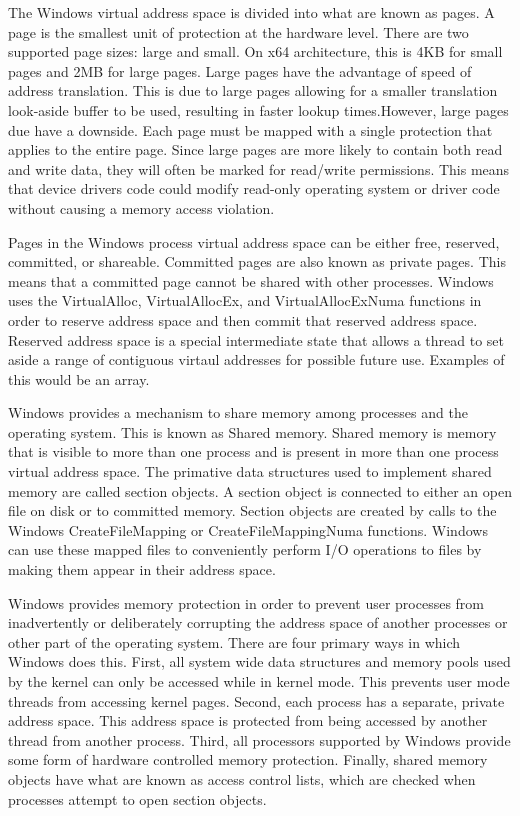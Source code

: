 \documentclass[journal,letterpaper,draftclsnofoot,onecolumn,10pt]{IEEEtran}
\begin{document}
The Windows virtual address space is divided into what are known as pages. A page is the smallest unit of protection at the hardware level. There are two supported page sizes: large and small. On x64 architecture, this is 4KB for small pages and 2MB for large pages. Large pages have the advantage of speed of address translation. This is due to large pages allowing for a smaller translation look-aside buffer to be used, resulting in faster lookup times.However, large pages due have a downside. Each page must be mapped with a single protection that applies to the entire page. Since large pages are more likely to contain both read and write data, they will often be marked for read/write permissions. This means that device drivers code could modify read-only operating system or driver code without causing a memory access violation.\cite{2ris12}

Pages in the Windows process virtual address space can be either free, reserved, committed, or shareable. Committed pages are also known as private pages. This means that a committed page cannot be shared with other processes. Windows uses the VirtualAlloc, VirtualAllocEx, and VirtualAllocExNuma functions in order to reserve address space and then commit that reserved address space. Reserved address space is a special intermediate state that allows a thread to set aside a range of contiguous virtaul addresses for possible future use. Examples of this would be an array.\cite{2ris12}

Windows provides a mechanism to share memory among processes and the operating system. This is known as Shared memory. Shared memory is memory that is visible to more than one process and is present in more than one process virtual address space. The primative data structures used to implement shared memory are called section objects. A section object is connected to either an open file on disk or to committed memory. Section objects are created by calls to the Windows CreateFileMapping or CreateFileMappingNuma functions. Windows can use these mapped files to conveniently perform I/O operations to files by making them appear in their address space.\cite{2ris12}

Windows provides memory protection in order to prevent user processes from inadvertently or deliberately corrupting the address space of another processes or other part of the operating system. There are four primary ways in which Windows does this. First, all system wide data structures and memory pools used by the kernel can only be accessed while in kernel mode. This prevents user mode threads from accessing kernel pages. Second, each process has a separate, private address space. This address space is protected from being accessed by another thread from another process. Third, all processors supported by Windows provide some form of hardware controlled memory protection. Finally, shared memory objects have what are known as access control lists, which are checked when processes attempt to open section objects.\cite{2ris12}
\end{document}
